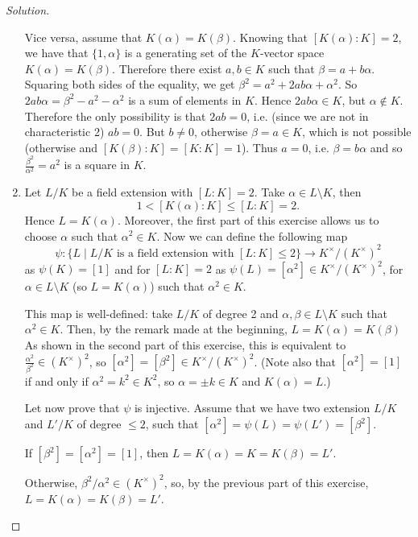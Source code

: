 \documentclass[a4paper,10pt,reqno]{amsart}
\newenvironment{sol}
  {\renewcommand\qedsymbol{$\blacksquare$}\begin{proof}[Solution]}
  {\end{proof}}
\begin{document}
\begin{sol}
\begin{enumerate}[label=(\roman*)]
        Vice versa, assume that 
        $K(\alpha)=K(\beta)$.
        Knowing that $[K(\alpha):K]=2$, 
        we have that $\{1,\alpha\}$ 
        is a generating set of the $K$-vector space $K(\alpha)=K(\beta)$.
        Therefore there exist $a,b\in K$ such that
        $\beta=a+b\alpha$.
        Squaring both sides of the equality, we get
        $\beta^2=a^2+2ab\alpha+\alpha^2$.
        So
        $2ab\alpha=\beta^2-a^2-\alpha^2$ is a sum of elements in $K$.
        Hence $2ab\alpha\in K$, but $\alpha\not\in K$.
        Therefore the only possibility is that $2ab=0$, i.e. (since we are not in characteristic 2)
        $ab=0$. But $b\neq 0$, otherwise $\beta=a\in K$, which is not possible (otherwise
        and $[K(\beta):K]=[K:K]=1$).
        Thus $a=0$, i.e. $\beta=b\alpha$ and so $\frac{\beta^2}{\alpha^2}=a^2$ is a square in $K$.
        \item Let $L/K$ be a field extension with $[L:K]=2$. 
        Take $\alpha\in L\setminus K$, then
        \[
        1<[K(\alpha):K]\leq [L:K]=2.
        \]
        Hence $L=K(\alpha)$.
        Moreover, the first part of this exercise allows us to choose $\alpha$ such that $\alpha^2\in K$.
        Now we can define the following map
        \[\psi:\{L\mid L/K \text{ is a field extension with } [L:K] \leq 2\}\to K^\times/(K^\times)^2\]
        as $\psi(K)=[1]$ and for
        $[L:K]=2$ as $\psi(L)=[\alpha^2]\in K^\times/(K^\times)^2$, for $\alpha\in L\setminus K$ (so $L=K(\alpha)$) such that $\alpha^2\in K$.     
        
        This map is well-defined:
        take $L/K$ of degree 2 and
        $\alpha,\beta\in L\setminus K$ such that $\alpha^2\in K$.
        Then, by the remark made at the beginning, $L=K(\alpha)=K(\beta)$ 
        As shown in the second part of this exercise, this is equivalent to $\frac{\alpha^2}{\beta^2}\in (K^\times)^2$, so $[\alpha^2]=[\beta^2]\in K^\times/(K^\times)^2$.
        (Note also that $[\alpha^2]=[1]$  if and only if $\alpha^2 =k^2\in K^2$,
        so $\alpha=\pm k\in K$ and $K(\alpha)=L$.)

        Let now prove that $\psi$ is injective.
        Assume that we have 
        two extension $L/K$ and 
        $L'/K$ of degree $\leq 2$, such that
        $[\alpha^2]=\psi(L)=\psi(L')=[\beta^2]$.
        
        If $[\beta^2]=[\alpha^2]=[1]$,
        then $L=K(\alpha)=K=K(\beta)=L'$.
        
        Otherwise, $\beta^2/\alpha^2\in (K^\times)^2$,
        so, by the previous part of this exercise,
        $L=K(\alpha)=K(\beta)=L'$.     


\end{enumerate}
\end{sol}
\end{document}
